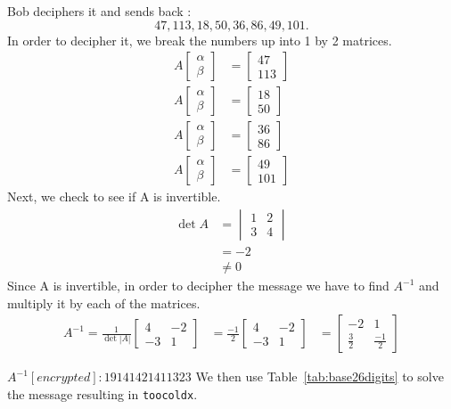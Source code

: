 \begin{example} Bob deciphers it and sends back : \[47, 113, 18, 50, 36, 86, 49, 101.\]
In order to decipher it, we break the numbers up into 1 by 2 matrices.
 \begin{align*} 
 A
 \begin{bmatrix}
    \alpha \\
    \beta 
\end{bmatrix} &= 
\begin{bmatrix}
    47 \\
    113
\end{bmatrix}\\
A
 \begin{bmatrix}
    \alpha \\
    \beta 
\end{bmatrix} &= 
\begin{bmatrix}
    18\\
    50
\end{bmatrix}\\
A
 \begin{bmatrix}
    \alpha \\
    \beta  
\end{bmatrix} &= 
\begin{bmatrix}
    36 \\
    86
\end{bmatrix}\\
A
 \begin{bmatrix}
    \alpha \\
    \beta 
\end{bmatrix} &= 
\begin{bmatrix}
    49 \\
    101
\end{bmatrix}
\end{align*}
Next, we check to see if A is invertible.
\begin{align*}
\det A &=
\begin{vmatrix}
1 & 2 \\ 
3 & 4
\end{vmatrix}\\
&= -2 \\
&\neq 0
\end{align*}
Since A is invertible, in order to decipher the message we have to find $A^{-1}$ and multiply it by each of the matrices.
\begin{align*}
A^{-1} = \frac{1}{\det |A|}
\begin{bmatrix}
    4 & -2 \\
    -3 & 1
\end{bmatrix}
&= \frac{-1}{2}
\begin{bmatrix}
    4 & -2 \\
    -3 & 1
\end{bmatrix}
&= 
\begin{bmatrix}
    -2 & 1 \\
    \frac{3}{2} & \frac{-1}{2}
\end{bmatrix}
\end{align*}

$A^{-1}[encrypted] : 19 14 14 2 14 11 3 23$
We then use Table~\ref{tab:base26digits} to solve the message resulting in {\tt toocoldx}. 
\end{example}

